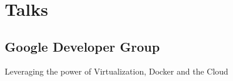 \documentclass[]{Achyudh_Resume}
\begin{document}
\begin{minipage}[t]{0.32\textwidth}


\section{Talks}
\subsection{Google Developer Group}
Leveraging the power of Virtualization, Docker and the Cloud \\


\end{minipage}
\end{document}
